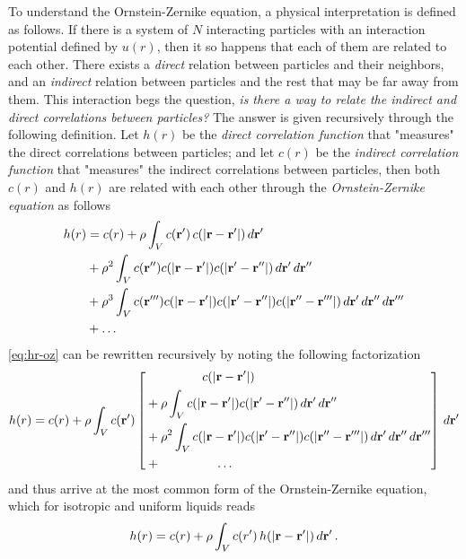 To understand the Ornstein-Zernike equation, a physical interpretation is defined as
follows. If there is a system of $N$ interacting particles with an interaction potential
defined by $u(r)$, then it so happens that each of them are related to each other.
There exists a \emph{direct} relation between particles and
their neighbors, and an \emph{indirect} relation between particles and the rest that
may be far away from them. This interaction begs the question,
\emph{is there a way to relate the indirect and direct correlations between particles?}
The answer is given recursively through the following definition. Let $h(r)$ be the
\emph{direct correlation function} that "measures" the direct correlations between
particles; and let $c(r)$ be the \emph{indirect correlation function} that "measures"
the indirect correlations between particles, then both $c(r)$ and $h(r)$ are related
with each other through the \emph{Ornstein-Zernike equation} as follows
\begin{equation}
    \begin{aligned}
        h(r) &= c(r) + \rho \int_{V} c(\mathbf{r}') \, c(\lvert \mathbf{r} - \mathbf{r}' \rvert) \, d \mathbf{r}' \\
        &+ \rho^2 \int_{V} c(\mathbf{r}'') c(\lvert \mathbf{r} - \mathbf{r}' \rvert) c(\lvert \mathbf{r}' - \mathbf{r}'' \rvert) \, d \mathbf{r}' \, d \mathbf{r}'' \\
        &+ \rho^3 \int_{V} c(\mathbf{r}''') c(\lvert \mathbf{r} - \mathbf{r}' \rvert) c(\lvert \mathbf{r}' - \mathbf{r}'' \rvert) c(\lvert \mathbf{r}'' - \mathbf{r}''' \rvert) \, d \mathbf{r}' \, d \mathbf{r}''
        \, d \mathbf{r}''' \\
        &+ \dots
    \end{aligned}
    \label{eq:hr-oz}
\end{equation}
\autoref{eq:hr-oz} can be rewritten recursively by noting the following factorization
\begin{equation}
    h(r) = c(r) + \rho \int_{V} c(\mathbf{r}') \left[
    \begin{aligned}
        & \hspace{1.6cm} c(\lvert \mathbf{r} - \mathbf{r}' \rvert) \\
        &+ \rho \int_{V} c(\lvert \mathbf{r} - \mathbf{r}' \rvert) c(\lvert \mathbf{r}' - \mathbf{r}'' \rvert) \, d \mathbf{r}' \, d \mathbf{r}'' \\
        &+ \rho^2 \int_{V} c(\lvert \mathbf{r} - \mathbf{r}' \rvert) c(\lvert \mathbf{r}' - \mathbf{r}'' \rvert) c(\lvert \mathbf{r}'' - \mathbf{r}''' \rvert) \, d \mathbf{r}' \, d \mathbf{r}''
        \, d \mathbf{r}''' \\
        &+ \hspace{1.6cm} \dots
    \end{aligned}
    \right] \, d \mathbf{r}'
    \label{eq:oz-factorization}
\end{equation}
and thus arrive at the most common form of the Ornstein-Zernike equation, which for
isotropic and uniform liquids reads
\begin{equation}
    h(r) = c(r) + \rho \int_{V} c(r') \, h(\lvert \mathbf{r} - \mathbf{r}' \rvert) \, d \mathbf{r}'
    \, .
    \label{eq:ornstein-zernike}
\end{equation}

